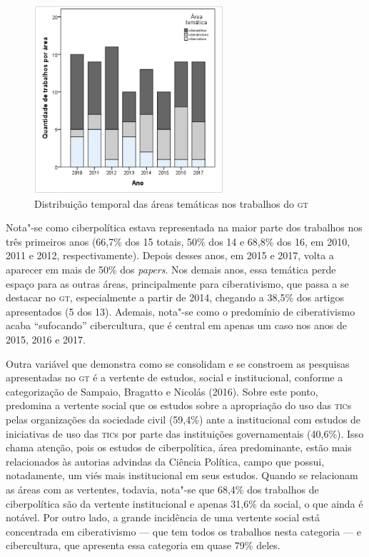  \begin{figure}[!ht]
 \centering
  \includegraphics[width=70mm]{./imgs/graf3_5.png}
 \caption{Distribuição temporal das áreas temáticas nos trabalhos do \textsc{gt}\footnotemark}
 \end{figure}


Nota"-se como ciberpolítica estava representada na maior parte dos
trabalhos nos três primeiros anos (66,7\% dos 15 totais, 50\% dos 14 e
68,8\% dos 16, em 2010, 2011 e 2012, respectivamente). Depois desses
anos, em 2015 e 2017, volta a aparecer em mais de 50\% dos
\emph{papers}. Nos demais anos, essa temática perde espaço para as
outras áreas, principalmente para ciberativismo, que passa a se destacar
no \textsc{gt}, especialmente a partir de 2014, chegando a 38,5\% dos artigos
apresentados (5 dos 13). Ademais, nota"-se como o predomínio de
ciberativismo acaba ``sufocando'' cibercultura, que é central em apenas
um caso nos anos de 2015, 2016 e 2017.

Outra variável que demonstra como se consolidam e se constroem as
pesquisas apresentadas no \textsc{gt} é a vertente de estudos, social e
institucional, conforme a categorização de Sampaio, Bragatto e Nicolás
(2016). Sobre este ponto, predomina a vertente social que os estudos
sobre a apropriação do uso das \textsc{tic}s pelas organizações da sociedade
civil (59,4\%) ante a institucional com estudos de iniciativas de uso
das \textsc{tic}s por parte das instituições governamentais (40,6\%). Isso chama
atenção, pois os estudos de ciberpolítica, área predominante, estão mais
relacionados às autorias advindas da Ciência Política, campo que possui,
notadamente, um viés mais institucional em seus estudos. Quando se
relacionam as áreas com as vertentes, todavia, nota"-se que 68,4\% dos
trabalhos de ciberpolítica são da vertente institucional e apenas 31,6\%
da social, o que ainda é notável. Por outro lado, a grande incidência de
uma vertente social está concentrada em ciberativismo --- que tem todos
os trabalhos nesta categoria --- e cibercultura, que apresenta essa
categoria em quase 79\% deles.

